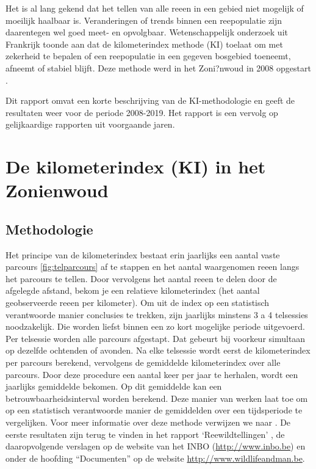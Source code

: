 \documentclass[twoside]{extreport}
\begin{document}
Het is al lang gekend dat het tellen van alle reeen in een gebied niet
mogelijk of moeilijk haalbaar is. Veranderingen of trends binnen een
reepopulatie zijn daarentegen wel goed meet- en opvolgbaar.
Wetenschappelijk onderzoek uit Frankrijk toonde aan dat de
kilometerindex methode (KI) toelaat om met zekerheid te bepalen of een
reepopulatie in een gegeven bosgebied toeneemt, afneemt of stabiel
blijft. Deze methode werd in het Zoni?nwoud in 2008 opgestart
\citep{Vercammen2011}.

Dit rapport omvat een korte beschrijving van de KI-methodologie en geeft
de resultaten weer voor de periode 2008-2019. Het rapport is een vervolg
op gelijkaardige rapporten uit voorgaande jaren.

\chapter{De kilometerindex (KI) in het
Zonienwoud}\label{de-kilometerindex-ki-in-het-zonienwoud}

\section{Methodologie}\label{methodologie}

Het principe van de kilometerindex bestaat erin jaarlijks een aantal
vaste parcours \ref{fig:telparcours} af te stappen en het aantal
waargenomen reeen langs het parcours te tellen. Door vervolgens het
aantal reeen te delen door de afgelegde afstand, bekom je een relatieve
kilometerindex (het aantal geobserveerde reeen per kilometer). Om uit de
index op een statistisch verantwoorde manier conclusies te trekken, zijn
jaarlijks minstens 3 a 4 telsessies noodzakelijk. Die worden liefst
binnen een zo kort mogelijke periode uitgevoerd. Per telsessie worden
alle parcours afgestapt. Dat gebeurt bij voorkeur simultaan op dezelfde
ochtenden of avonden. Na elke telsessie wordt eerst de kilometerindex
per parcours berekend, vervolgens de gemiddelde kilometerindex over alle
parcours. Door deze procedure een aantal keer per jaar te herhalen,
wordt een jaarlijks gemiddelde bekomen. Op dit gemiddelde kan een
betrouwbaarheidsinterval worden berekend. Deze manier van werken laat
toe om op een statistisch verantwoorde manier de gemiddelden over een
tijdsperiode te vergelijken. Voor meer informatie over deze methode
verwijzen we naar \citet{Malengreaux2008}. De eerste resultaten zijn
terug te vinden in het rapport `Reewildtellingen' \citep{Vercammen2011},
de daaropvolgende verslagen op de website van het INBO
(\url{http://www.inbo.be}) en onder de hoofding ``Documenten'' op de
website \url{http://www.wildlifeandman.be}.
\end{document}
